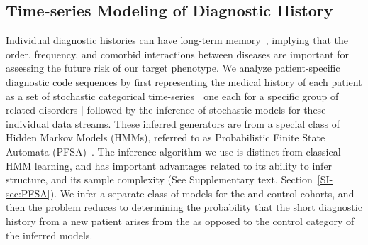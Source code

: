 \documentclass[3p,super,numbers,sort&compress,preprint,10pt]{elsarticle}
\begin{document}
\subsection*{Time-series Modeling of  Diagnostic History}
Individual diagnostic histories  can have long-term memory~\cite{ltgranger80}, implying that the order, frequency, and comorbid interactions between diseases are   important for assessing the future risk of our target phenotype. 
We analyze  patient-specific  diagnostic code sequences by first  representing the medical history of each patient as a set of stochastic categorical time-series | one each for a specific group of related disorders |  followed by the inference of stochastic models  for  these individual data streams. These inferred generators are from a special class of  Hidden Markov Models (HMMs), referred to as Probabilistic Finite State Automata (PFSA)~\cite{CL12g}. The inference algorithm we use is distinct from classical HMM learning, and has important advantages related to its ability to infer structure, and its sample complexity (See Supplementary text, Section~\ref{SI-sec:PFSA}). We infer a separate class of models for the \treatment and control cohorts, and then the problem reduces to determining the probability that the short diagnostic history from a  new  patient arises from the \treatment as opposed to the control category of the inferred models. 
\end{document}
